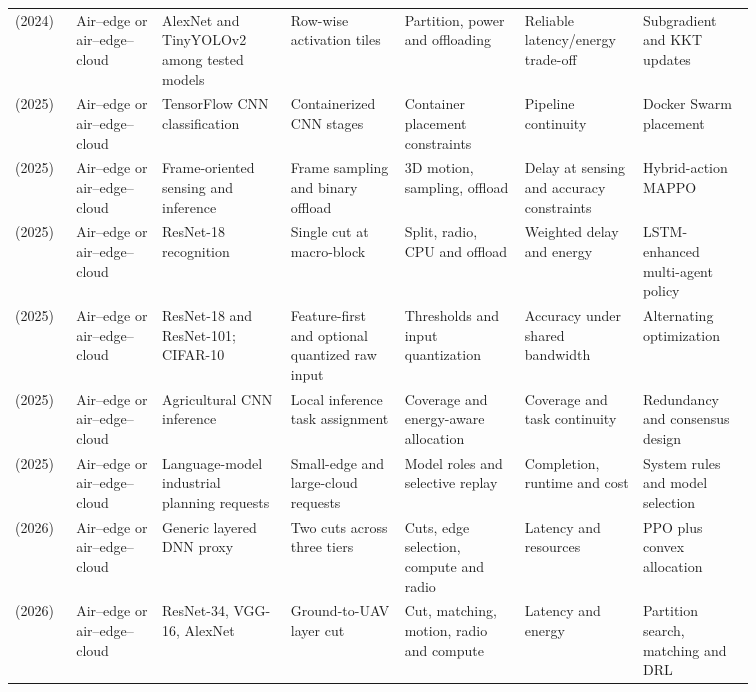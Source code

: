 \begin{table}[!tp]
\begin{tabular}{@{}Y{0.0705\linewidth}Y{0.1043\linewidth}Y{0.1589\linewidth}Y{0.1363\linewidth}Y{0.1419\linewidth}Y{0.1175\linewidth}Y{0.1307\linewidth}@{}}
\cite{R0044}\newline\mbox{(2024)} & Air--edge or air--edge--cloud & AlexNet and TinyYOLOv2 among tested models & Row-wise activation tiles & Partition, power and offloading & Reliable latency\allowbreak{}/energy trade-off & Subgradient and KKT updates \\
\cite{R0038}\newline\mbox{(2025)} & Air--edge or air--edge--cloud & TensorFlow CNN classification & Containerized CNN stages & Container placement constraints & Pipeline continuity & Docker Swarm placement \\
\cite{R0064}\newline\mbox{(2025)} & Air--edge or air--edge--cloud & Frame-oriented sensing and inference & Frame sampling and binary offload & 3D motion, sampling, offload & Delay at sensing and accuracy constraints & Hybrid-action MAPPO \\
\cite{R0071}\newline\mbox{(2025)} & Air--edge or air--edge--cloud & ResNet-18 recognition & Single cut at macro-block & Split, radio, CPU and offload & Weighted delay and energy & LSTM-enhanced multi-agent policy \\
\cite{R0080}\newline\mbox{(2025)} & Air--edge or air--edge--cloud & ResNet-18 and ResNet-101; CIFAR-10 & Feature-first and optional quantized raw input & Thresholds and input quantization & Accuracy under shared bandwidth & Alternating optimization \\
\cite{R0090}\newline\mbox{(2025)} & Air--edge or air--edge--cloud & Agricultural CNN inference & Local inference task assignment & Coverage and energy-aware allocation & Coverage and task continuity & Redundancy and consensus design \\
\cite{R0145}\newline\mbox{(2025)} & Air--edge or air--edge--cloud & Language-model industrial planning requests & Small-edge and large-cloud requests & Model roles and selective replay & Completion, runtime and cost & System rules and model selection \\
\cite{R0001}\newline\mbox{(2026)} & Air--edge or air--edge--cloud & Generic layered DNN proxy & Two cuts across three tiers & Cuts, edge selection, compute and radio & Latency and resources & PPO plus convex allocation \\
\cite{R0009}\newline\mbox{(2026)} & Air--edge or air--edge--cloud & ResNet-34, VGG-16, AlexNet & Ground-to-UAV layer cut & Cut, matching, motion, radio and compute & Latency and energy & Partition search, matching and DRL \\

\end{tabular}
\end{table}
